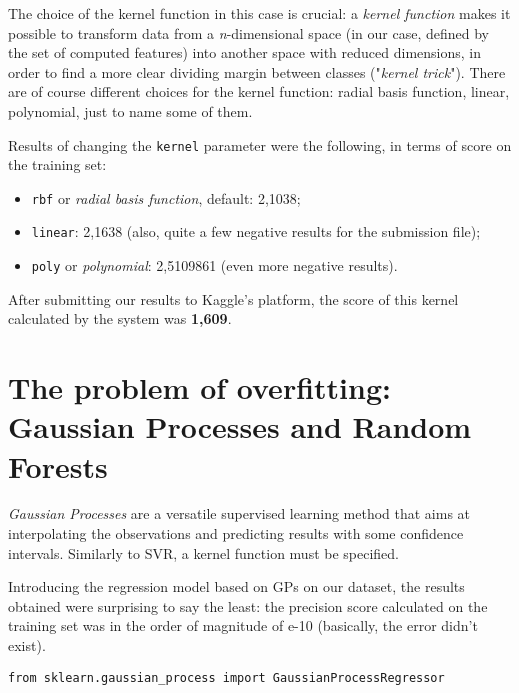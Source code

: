 The choice of the kernel function in this case is crucial: a \textit{kernel function} makes it possible to transform data from a \textit{n}-dimensional space (in our case, defined by the set of computed features) into another space with reduced dimensions, in order to find a more clear dividing margin between classes ("\textit{kernel trick}"). There are of course different choices for the kernel function: radial basis function, linear, polynomial, just to name some of them.

Results of changing the \texttt{kernel} parameter were the following, in terms of score on the training set:
\begin{itemize}
	\item \texttt{rbf} or \textit{radial basis function}, default: 2,1038;
	\item \texttt{linear}: 2,1638 (also, quite a few negative results for the submission file);
	\item \texttt{poly} or \textit{polynomial}: 2,5109861 (even more negative results).
\end{itemize}


After submitting our results to Kaggle's platform, the score of this kernel calculated by the system was \textbf{1,609}.


\section[Overfitting]{The problem of overfitting: Gaussian Processes and Random Forests}
\textit{Gaussian Processes} are a versatile supervised learning method that aims at interpolating the observations and predicting results with some confidence intervals. Similarly to SVR, a kernel function must be specified.

Introducing the regression model based on GPs on our dataset, the results obtained were surprising to say the least: the precision score calculated on the training set was in the order of magnitude of e-10 (basically, the error didn't exist).

\begin{lstlisting}[firstnumber=14]
from sklearn.gaussian_process import GaussianProcessRegressor
\end{lstlisting}

